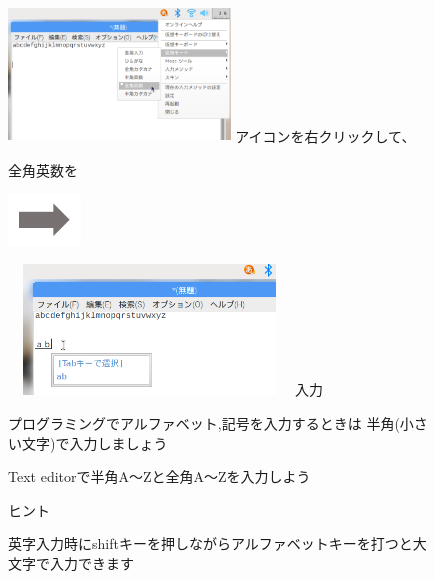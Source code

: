 \documentclass[a4paper,12pt]{jarticle}
\begin{document}
\begin{figure}[ht]
  \begin{minipage}{7.173cm}
    \includegraphics[width=5.889cm,height=3.596cm]{textbook-img069.png}
     アイコンを右クリックして、

    全角英数を
  \end{minipage}
  \includegraphics[width=1.919cm,height=1.365cm]{textbook-img053.png}
  \begin{minipage}{7.178cm}
    \includegraphics[width=7.471cm,height=3.469cm]{textbook-img070.png}
     入力
  \end{minipage}

  \vspace{3mm}
  \begin{minipage}{16.578cm}
    {\centering\large
      プログラミングでアルファベット,記号を入力するときは
      半角(小さい文字)で入力しましょう
    }
  \end{minipage}

  \flushleft
  \theQuestion\label{Q:hasAnswer02-5}

  Text editorで半角A〜Zと全角A〜Zを入力しよう

  ヒント


  英字入力時にshiftキーを押しながらアルファベットキーを打つと大文字で入力できます
\end{figure}
\clearpage
\end{document}
